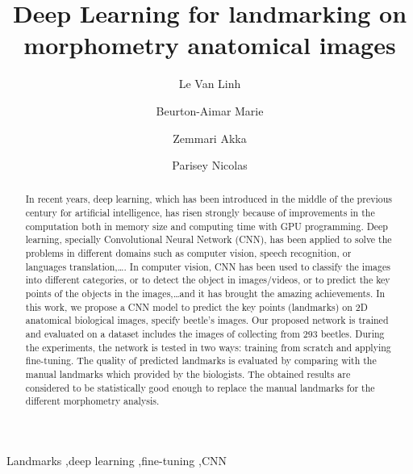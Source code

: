 \documentclass[review]{elsarticle}
\begin{document}
\begin{frontmatter}

\title{Deep Learning for landmarking on morphometry anatomical images}


\author[labri,itdlu]{Le Van Linh}
\author[labri]{Beurton-Aimar Marie}
\author[labri]{Zemmari Akka}
\author[igepp]{Parisey Nicolas}


\address[labri]{University of Bordeaux, 351, cours de la Libération, 33405 Talence, France}

\address[igepp]{UMR 1349 IGEPP, BP 35327, 35653 Le Rheu, France}
\address[itdlu]{Dalat University, Dalat, Lamdong, Vietnam}

\begin{abstract}
In recent years, deep learning, which has been introduced in the middle of the previous century for artificial intelligence, has risen strongly because of improvements in the computation both in memory size and computing time with GPU programming. Deep learning, specially Convolutional Neural Network (CNN), has been applied to solve the problems in different domains such as computer vision, speech recognition, or languages translation,\ldots. In computer vision, CNN has been used to classify the images into different categories, or to detect the object in images/videos, or to predict the key points of the objects in the images,\ldots and it has brought the amazing achievements. In this work, we propose a CNN model to predict the key points (landmarks) on 2D anatomical biological images, specify beetle's images. Our proposed network is trained and evaluated on a dataset includes the images of collecting from $293$ beetles. During the experiments, the network is tested in two ways: training from scratch and applying fine-tuning. The quality of predicted landmarks is evaluated by comparing with the manual landmarks which provided by the biologists. The obtained results are considered to be statistically good enough to replace the manual landmarks for the different morphometry analysis.
\end{abstract}

\begin{keyword}
Landmarks \sep deep learning \sep fine-tuning \sep CNN
\end{keyword}

\end{frontmatter}
\end{document}
